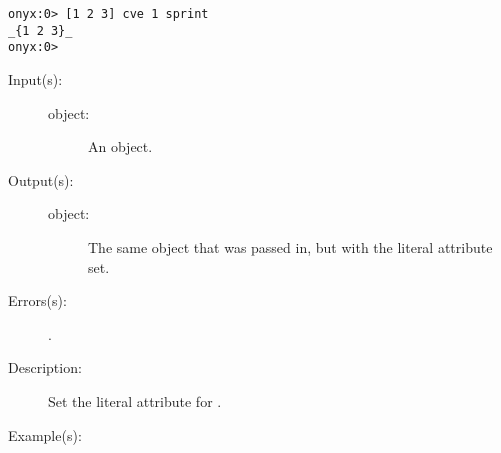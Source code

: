 \begin{description}
\begin{description}
\begin{verbatim}
onyx:0> [1 2 3] cve 1 sprint
_{1 2 3}_
onyx:0>
		\end{verbatim}
	\end{description}
\label{systemdict:cvlit}
\item[{\onyxop{object}{cvlit}{object}}: ]
	\begin{description}\item[]
	\item[Input(s): ]
		\begin{description}\item[]
		\item[object: ]
			An object.
		\end{description}
	\item[Output(s): ]
		\begin{description}\item[]
		\item[object: ]
			The same object that was passed in, but with the literal
			attribute set.
		\end{description}
	\item[Errors(s): ]
		\begin{description}\item[]
		\item[.]
		\end{description}
	\item[Description: ]
		Set the literal attribute for .
	\item[Example(s): ]\begin{verbatim}


\end{verbatim}
\end{description}
\end{description}
